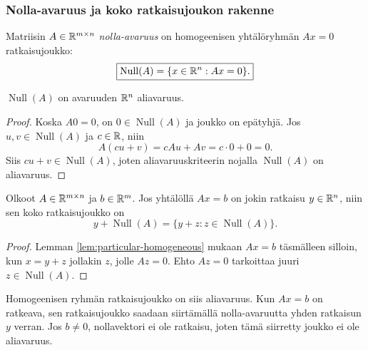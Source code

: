 \documentclass[11pt,a4paper]{amsart}
\begin{document}
  \subsubsection*{Nolla-avaruus ja koko ratkaisujoukon rakenne}

  \begin{definition}
    Matriisin $A\in\mathbb{R}^{m\times n}$ \emph{nolla-avaruus} on
    homogeenisen yhtälöryhmän $Ax=0$ ratkaisujoukko:
    \[
      \boxed{\operatorname{Null}(A)=\{x\in\mathbb{R}^n:Ax=0\}.}
    \]
  \end{definition}

  \begin{lemma}
    $\operatorname{Null}(A)$ on avaruuden $\mathbb{R}^n$ aliavaruus.
  \end{lemma}
  \begin{proof}
    Koska $A0=0$, on $0\in\operatorname{Null}(A)$ ja joukko on
    epätyhjä. Jos $u,v\in\operatorname{Null}(A)$ ja $c\in\mathbb{R}$, niin
    \[
      A(cu+v)=cAu+Av=c\cdot0+0=0.
    \]
    Siis $cu+v\in\operatorname{Null}(A)$, joten
    aliavaruuskriteerin nojalla $\operatorname{Null}(A)$ on aliavaruus.
  \end{proof}

  \begin{theorem}
    Olkoot $A\in\mathbb{R}^{m\times n}$ ja $b\in\mathbb{R}^m$. Jos yhtälöllä
    $Ax=b$ on jokin ratkaisu $y\in\mathbb{R}^n$, niin sen koko
    ratkaisujoukko on
    \[
      \boxed{y+\operatorname{Null}(A)
      =\{y+z:z\in\operatorname{Null}(A)\}.}
    \]
  \end{theorem}
  \begin{proof}
    Lemman \ref{lem:particular-homogeneous} mukaan $Ax=b$
    täsmälleen silloin, kun $x=y+z$ jollakin $z$, jolle $Az=0$.
    Ehto $Az=0$ tarkoittaa juuri $z\in\operatorname{Null}(A)$.
  \end{proof}

  Homogeenisen ryhmän ratkaisujoukko on siis aliavaruus.
  Kun $Ax=b$ on ratkeava, sen ratkaisujoukko saadaan siirtämällä
  nolla-avaruutta yhden ratkaisun $y$ verran. Jos $b\ne0$,
  nollavektori ei ole ratkaisu, joten tämä siirretty joukko ei ole
  aliavaruus.

  
\end{document}
